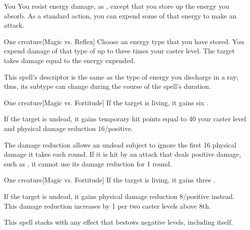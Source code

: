 \begin{spelltarget}{You}
    \spelleffect You resist energy damage, as , except that you store up the energy you absorb. As a standard action, you can expend some of that energy to make an attack.
\end{spelltarget}
\spellrng{\rngclose}
\begin{spelltarget}{One creature}[Magic vs. Reflex]
    \spelleffect Choose an energy type that you have stored. You expend damage of that type of up to three times your caster level.
    \spellsuccess The target takes damage equal to the energy expended.
\end{spelltarget}
\spellnotes This spell's descriptor is the same as the type of energy you discharge in a ray; thus, its subtype can change during the course of the spell's duration.

\spellrng{\rngclose}
\spelldur{\durshort}
\begin{spelltarget}{One creature}[Magic vs. Fortitude]
    \spelleffect If the target is living, it gains six \negativelevels.

    \spelleffect If the target is undead, it gains temporary hit points equal to 40 \add your caster level and physical damage reduction 16/positive.
\end{spelltarget}
\spellnotes The damage reduction allows an undead subject to ignore the first 16 physical damage it takes each round. If it is hit by an attack that deals positive damage, such as , it cannot use its damage reduction for 1 round.

\spellrng{\rngclose}
\spelldur{\durshort}
\begin{spelltarget}{One creature}[Magic vs. Fortitude]
    \spelleffect If the target is living, it gains three \negativelevels.

    If the target is undead, it gains physical damage reduction 8/positive instead. This damage reduction increases by 1 per two caster levels above 8th.
\end{spelltarget}
\spellnotes This spell stacks with any effect that bestows negative levels, including itself.

